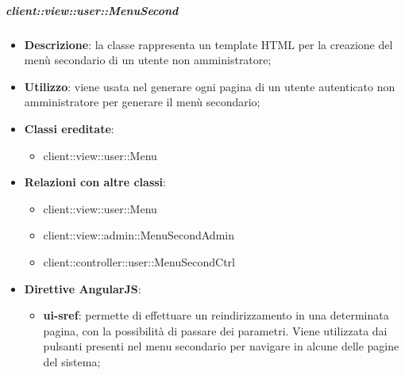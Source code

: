 		\subparagraph{client::view::user::MenuSecond} %
		\label{subp:bdsm_app_client_view_user_menusecond}

			\begin{itemize}
				\item \textbf{Descrizione}: la classe rappresenta un template HTML per la creazione del menù secondario di un utente non amministratore;
				\item \textbf{Utilizzo}: viene usata nel generare ogni pagina di un utente autenticato non amministratore per generare il menù secondario;
				\item \textbf{Classi ereditate}:
					\begin{itemize}
						\item client::view::user::Menu
					\end{itemize}
				\item \textbf{Relazioni con altre classi}:
					\begin{itemize}
						\item client::view::user::Menu
						\item client::view::admin::MenuSecondAdmin
						\item client::controller::user::MenuSecondCtrl
					\end{itemize}
				\item \textbf{Direttive AngularJS}:
					\begin{itemize}
						\item \textbf{ui-sref}: permette di effettuare un reindirizzamento in una determinata pagina, con la possibilità di passare dei parametri. Viene utilizzata dai pulsanti presenti nel menu secondario per navigare in alcune delle pagine del sistema;
					\end{itemize}
			\end{itemize}

